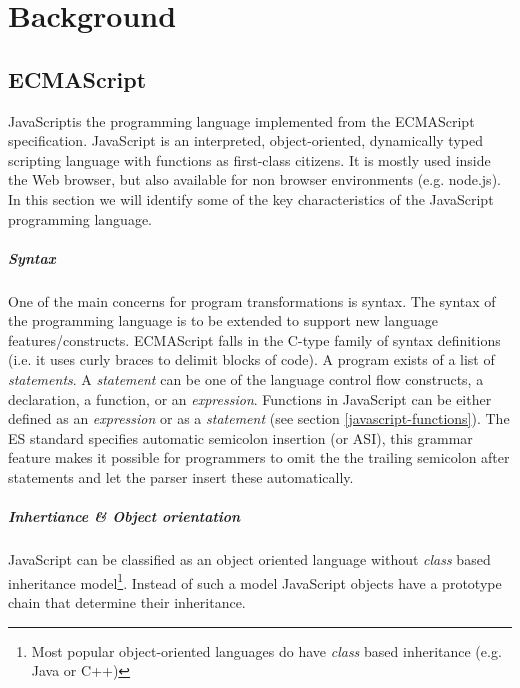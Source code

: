 
\chapter{Background} %

\label{Chapter3}


\section{ECMAScript} \label{javascript}
JavaScript\footnotemark is the programming language implemented from the ECMAScript specification\cite{SpecJS}. JavaScript is an interpreted, object-oriented, dynamically typed scripting language with functions as first-class citizens. It is mostly used inside the Web browser, but also available for non browser environments (e.g. node.js). In this section we will identify some of the key characteristics of the JavaScript programming language.

\paragraph{Syntax} \label{javascript-syntax}
One of the main concerns for program transformations is syntax. The syntax of the programming language is to be extended to support new language features/constructs. ECMAScript falls in the C-type family %
of syntax definitions (i.e. it uses curly braces to delimit blocks of code).
A program exists of a list of \textit{statements}. A \textit{statement} can be one of the language control flow constructs, a declaration, a function, or an \textit{expression}. Functions in JavaScript can be either defined as an \textit{expression} or as a \textit{statement} (see section \ref{javascript-functions}). The ES standard specifies automatic semicolon insertion (or ASI), this grammar feature makes it possible for programmers to omit the the trailing semicolon after statements and let the parser insert these automatically.

\paragraph{Inhertiance \& Object orientation} \label{javascript-inheritance}
JavaScript can be classified as an object oriented language without \textit{class} based inheritance model\footnote{Most popular object-oriented languages do have \textit{class} based inheritance (e.g. Java or C++)}. Instead of such a model JavaScript objects have a prototype chain that determine their inheritance.

